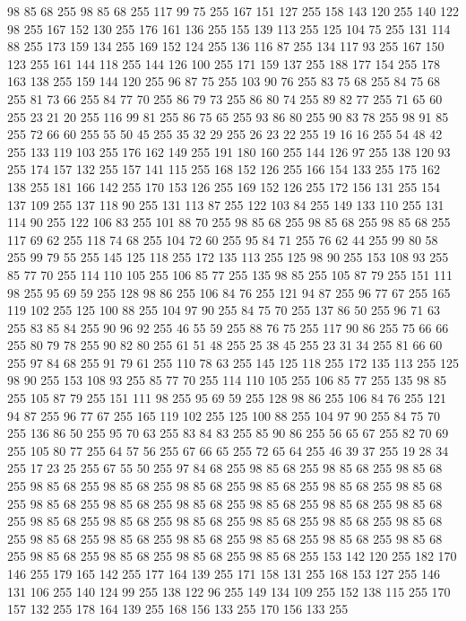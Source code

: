 98 85 68 255 98 85 68 255 117 99 75 255 167 151 127 255 158 143 120 255 140 122 98 255 167 152 130 255 176 161 136 255 155 139 113 255 125 104 75 255 131 114 88 255 173 159 134 255 169 152 124 255 136 116 87 255 134 117 93 255 167 150 123 255 161 144 118 255 144 126 100 255 171 159 137 255 188 177 154 255 178 163 138 255 159 144 120 255 96 87 75 255 103 90 76 255 83 75 68 255 84 75 68 255 81 73 66 255 84 77 70 255 86 79 73 255 86 80 74 255 89 82 77 255 71 65 60 255 23 21 20 255 116 99 81 255 86 75 65 255 93 86 80 255 90 83 78 255 98 91 85 255 72 66 60 255 55 50 45 255 35 32 29 255 26 23 22 255 19 16 16 255 54 48 42 255 133 119 103 255 176 162 149 255 191 180 160 255 144 126 97 255 138 120 93 255 174 157 132 255 157 141 115 255 168 152 126 255 166 154 133 255 175 162 138 255 181 166 142 255 170 153 126 255 169 152 126 255 172 156 131 255 154 137 109 255 137 118 90 255 131 113 87 255 122 103 84 255 149 133 110 255 131 114 90 255
122 106 83 255 101 88 70 255 98 85 68 255 98 85 68 255 98 85 68 255 117 69 62 255 118 74 68 255 104 72 60 255 95 84 71 255 76 62 44 255 99 80 58 255 99 79 55 255 145 125 118 255 172 135 113 255 125 98 90 255 153 108 93 255 85 77 70 255 114 110 105 255 106 85 77 255 135 98 85 255 105 87 79 255 151 111 98 255 95 69 59 255 128 98 86 255 106 84 76 255 121 94 87 255 96 77 67 255 165 119 102 255 125 100 88 255 104 97 90 255 84 75 70 255 137 86 50 255 96 71 63 255 83 85 84 255 90 96 92 255 46 55 59 255 88 76 75 255 117 90 86 255 75 66 66 255 80 79 78 255 90 82 80 255 61 51 48 255 25 38 45 255 23 31 34 255 81 66 60 255 97 84 68 255 91 79 61 255 110 78 63 255 145 125 118 255 172 135 113 255 125 98 90 255 153 108 93 255 85 77 70 255 114 110 105 255 106 85 77 255 135 98 85 255 105 87 79 255 151 111 98 255 95 69 59 255 128 98 86 255 106 84 76 255 121 94 87 255 96 77 67 255 165 119 102 255
125 100 88 255 104 97 90 255 84 75 70 255 136 86 50 255 95 70 63 255 83 84 83 255 85 90 86 255 56 65 67 255 82 70 69 255 105 80 77 255 64 57 56 255 67 66 65 255 72 65 64 255 46 39 37 255 19 28 34 255 17 23 25 255 67 55 50 255 97 84 68 255 98 85 68 255 98 85 68 255 98 85 68 255 98 85 68 255 98 85 68 255 98 85 68 255 98 85 68 255 98 85 68 255 98 85 68 255 98 85 68 255 98 85 68 255 98 85 68 255 98 85 68 255 98 85 68 255 98 85 68 255 98 85 68 255 98 85 68 255 98 85 68 255 98 85 68 255 98 85 68 255 98 85 68 255 98 85 68 255 98 85 68 255 98 85 68 255 98 85 68 255 98 85 68 255 98 85 68 255 98 85 68 255 98 85 68 255 98 85 68 255 98 85 68 255 153 142 120 255 182 170 146 255 179 165 142 255 177 164 139 255 171 158 131 255 168 153 127 255 146 131 106 255 140 124 99 255 138 122 96 255 149 134 109 255 152 138 115 255 170 157 132 255 178 164 139 255 168 156 133 255 170 156 133 255
